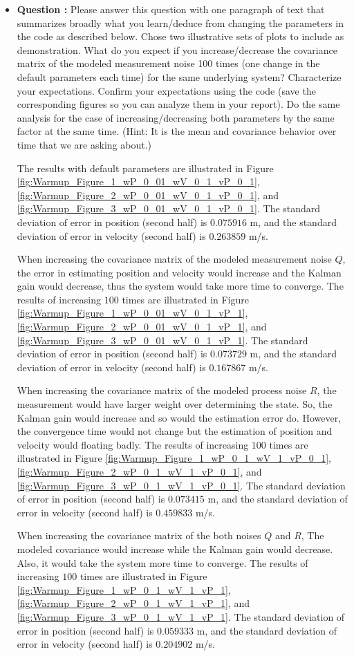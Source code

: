\documentclass[11pt,a4paper]{article}
\begin{document}
\begin{itemize}
	\item \addtocounter{cnt_questions}{1} \textbf{Question :} Please answer this question with one paragraph of text that summarizes broadly what you learn/deduce from changing the parameters in the code as described below. Chose two illustrative sets of plots to include as demonstration. What do you expect if you increase/decrease the covariance matrix of the modeled measurement noise 100 times (one change in the default parameters each time) for the same underlying system? Characterize your expectations. Confirm your expectations using the code (save the corresponding figures so you can analyze them in your report). Do the same analysis for the case of increasing/decreasing both parameters by the same factor at the same time. (Hint: It is the mean and covariance behavior over time that we are asking about.)
		\par The results with default parameters are illustrated in Figure \ref{fig:Warmup_Figure_1_wP_0_01_wV_0_1_vP_0_1}, \ref{fig:Warmup_Figure_2_wP_0_01_wV_0_1_vP_0_1}, and \ref{fig:Warmup_Figure_3_wP_0_01_wV_0_1_vP_0_1}. The standard deviation of error in position (second half) is $0.075916$ m, and the standard deviation of error in velocity (second half) is $0.263859$ m/s.
		\par When increasing the covariance matrix of the modeled measurement noise $Q$, the error in estimating position and velocity would increase and the Kalman gain would decrease, thus the system would take more time to converge. The results of increasing $100$ times are illustrated in Figure \ref{fig:Warmup_Figure_1_wP_0_01_wV_0_1_vP_1}, \ref{fig:Warmup_Figure_2_wP_0_01_wV_0_1_vP_1}, and \ref{fig:Warmup_Figure_3_wP_0_01_wV_0_1_vP_1}. The standard deviation of error in position (second half) is $0.073729$ m, and the standard deviation of error in velocity (second half) is $0.167867$ m/s.
		\par When increasing the covariance matrix of the modeled process noise $R$, the measurement would have larger weight over determining the state. So, the Kalman gain would increase and so would the estimation error do. However, the convergence time would not change but the estimation of position and velocity would floating badly. The results of increasing $100$ times are illustrated in Figure \ref{fig:Warmup_Figure_1_wP_0_1_wV_1_vP_0_1}, \ref{fig:Warmup_Figure_2_wP_0_1_wV_1_vP_0_1}, and \ref{fig:Warmup_Figure_3_wP_0_1_wV_1_vP_0_1}. The standard deviation of error in position (second half) is $0.073415$ m, and the standard deviation of error in velocity (second half) is $0.459833$ m/s.
		\par When increasing the covariance matrix of the both noises $Q$ and $R$, The modeled covariance would increase while the Kalman gain would decrease. Also, it would take the system more time to converge. The results of increasing $100$ times are illustrated in Figure \ref{fig:Warmup_Figure_1_wP_0_1_wV_1_vP_1}, \ref{fig:Warmup_Figure_2_wP_0_1_wV_1_vP_1}, and \ref{fig:Warmup_Figure_3_wP_0_1_wV_1_vP_1}. The standard deviation of error in position (second half) is $0.059333$ m, and the standard deviation of error in velocity (second half) is $0.204902$ m/s.


\end{itemize}
\end{document}
